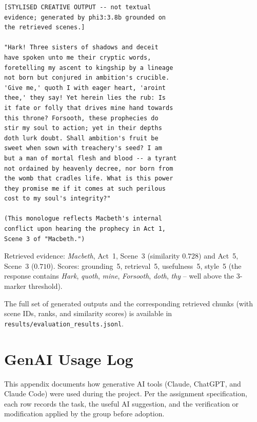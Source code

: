 \documentclass[10pt,conference]{IEEEtran}
\begin{document}
\begin{lstlisting}[basicstyle=\ttfamily\scriptsize,frame=single,xleftmargin=0pt,breaklines=true]
[STYLISED CREATIVE OUTPUT -- not textual
evidence; generated by phi3:3.8b grounded on
the retrieved scenes.]

"Hark! Three sisters of shadows and deceit
have spoken unto me their cryptic words,
foretelling my ascent to kingship by a lineage
not born but conjured in ambition's crucible.
'Give me,' quoth I with eager heart, 'aroint
thee,' they say! Yet herein lies the rub: Is
it fate or folly that drives mine hand towards
this throne? Forsooth, these prophecies do
stir my soul to action; yet in their depths
doth lurk doubt. Shall ambition's fruit be
sweet when sown with treachery's seed? I am
but a man of mortal flesh and blood -- a tyrant
not ordained by heavenly decree, nor born from
the womb that cradles life. What is this power
they promise me if it comes at such perilous
cost to my soul's integrity?"

(This monologue reflects Macbeth's internal
conflict upon hearing the prophecy in Act 1,
Scene 3 of "Macbeth.")
\end{lstlisting}

Retrieved evidence: \emph{Macbeth}, Act~1, Scene~3
(similarity $0.728$) and Act~5, Scene~3 ($0.710$). Scores:
grounding~5, retrieval~5, usefulness~5, style~5 (the response
contains \emph{Hark}, \emph{quoth}, \emph{mine}, \emph{Forsooth},
\emph{doth}, \emph{thy} -- well above the 3-marker threshold).

The full set of generated outputs and the corresponding retrieved
chunks (with scene IDs, ranks, and similarity scores) is available
in \verb|results/evaluation_results.jsonl|.

\section{GenAI Usage Log}
\label{app:genai-log}

This appendix documents how generative AI tools (Claude, ChatGPT, and
Claude Code) were used during the project. Per the assignment
specification, each row records the task, the useful AI suggestion,
and the verification or modification applied by the group before
adoption.
\end{document}
